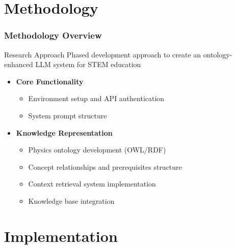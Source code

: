 \documentclass{beamer}
\begin{document}
\section{Methodology}

\begin{frame}
\frametitle{Methodology Overview}

\begin{block}{Research Approach}
Phased development approach to create an ontology-enhanced LLM system for STEM education
\end{block}

\begin{itemize}
    \item \textbf{Core Functionality}
    \begin{itemize}
        \item Environment setup and API authentication
        \item System prompt structure
    \end{itemize}
    
    \item \textbf{Knowledge Representation}
    \begin{itemize}
        \item Physics ontology development (OWL/RDF)
        \item Concept relationships and prerequisites structure
        \item Context retrieval system implementation
        \item Knowledge base integration
    \end{itemize}
\end{itemize}
\end{frame}

\section{Implementation}
\end{document}
